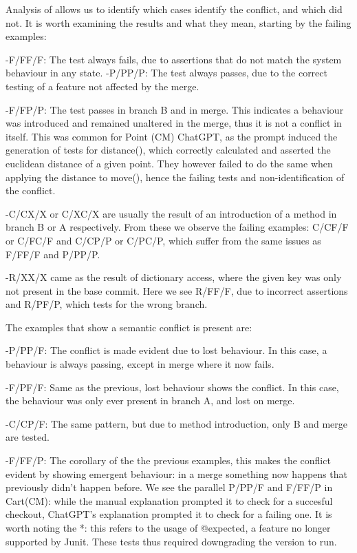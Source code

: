 



Analysis of  allows us to identify which cases identify the conflict, and which did not.
It is worth examining the results and what they mean, starting by the failing examples:

-F/FF/F: The test always fails, due to assertions that do not match the system behaviour in any state.
-P/PP/P: The test always passes, due to the correct testing of a feature not affected by the merge.

-F/FP/P: The test passes in branch B and in merge. This indicates a behaviour was introduced and remained unaltered in the merge, thus it is not a conflict in itself.
This was common for Point (CM) ChatGPT, as the prompt induced the generation of tests for distance(), which correctly calculated and asserted the euclidean distance of a given point.
They however failed to do the same when applying the distance to move(), hence the failing tests and non-identification of the conflict.

-C/CX/X or C/XC/X are usually the result of an introduction of a method in branch B or A respectively.
From these we observe the failing examples: C/CF/F or C/FC/F and C/CP/P or C/PC/P, which suffer from the same issues as F/FF/F and P/PP/P.

-R/XX/X came as the result of dictionary access, where the given key was only not present in the base commit.
Here we see R/FF/F, due to incorrect assertions and R/PF/P, which tests for the wrong branch.


The examples that show a semantic conflict is present are:

-P/PP/F: The conflict is made evident due to lost behaviour. In this case, a behaviour is always passing, except in merge where it now fails.

-F/PF/F: Same as the previous, lost behaviour shows the conflict. In this case, the behaviour was only ever present in branch A, and lost on merge.

-C/CP/F: The same pattern, but due to method introduction, only B and merge are tested.

-F/FF/P: The corollary of the the previous examples, this makes the conflict evident by showing emergent behaviour: in a merge something now happens that previously didn't happen before.
We see the parallel P/PP/F and F/FF/P in Cart(CM): while the manual explanation prompted it to check for a succesful checkout, ChatGPT's explanation prompted it to check for a failing one.
It is worth noting the *: this refers to the usage of @expected, a feature no longer supported by Junit. These tests thus required downgrading the version to run.


